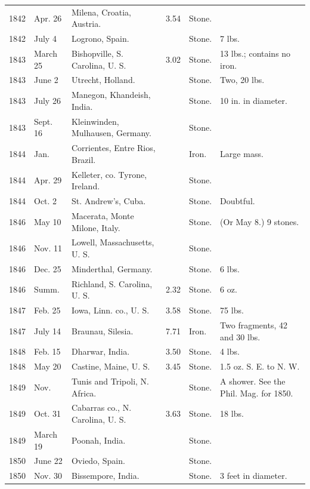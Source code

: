 \documentclass[a4paper, 12pt, oneside]{article}
\begin{document}
\begin{center}
\begin{longtable}{|p{10mm}|p{15mm}|p{32mm}|p{13mm}|p{13mm}|p{26mm}|}
        1842 & Apr. 26 & Milena, Croatia, Austria. & 3.54 & Stone. & ~ \\
        1842 & July 4 & Logrono, Spain. & ~ & Stone. & 7 lbs. \\
        1843 & March 25 & Bishopville, S. Carolina, U. S. & 3.02 & Stone. & 13 lbs.; contains no iron. \\
        1843 & June 2 & Utrecht, Holland. & ~ & Stone. & Two, 20 lbs. \\
        1843 & July 26 & Manegon, Khandeish, India. & ~ & Stone. & 10 in. in diameter. \\
        1843 & Sept. 16 & Kleinwinden, Mulhausen, Germany. & ~ & Stone. & ~ \\
        1844 & Jan. & Corrientes, Entre Rios, Brazil. & ~ & Iron. & Large mass. \\
        1844 & Apr. 29 & Kelleter, co. Tyrone, Ireland. & ~ & Stone. & ~ \\
        1844 & Oct. 2 & St. Andrew’s, Cuba. & ~ & Stone. & Doubtful. \\
        1846 & May 10 & Macerata, Monte Milone, Italy. & ~ & Stone. & (Or May 8.) 9 stones. \\
        1846 & Nov. 11 & Lowell, Massachusetts, U. S. & ~ & Stone. & ~ \\
        1846 & Dec. 25 & Minderthal, Germany. & ~ & Stone. & 6 lbs. \\
        1846 & Summ. & Richland, S. Carolina, U. S. & 2.32 & Stone. & 6 oz. \\
        1847 & Feb. 25 & Iowa, Linn. co., U. S. & 3.58 & Stone. & 75 lbs. \\
        1847 & July 14 & Braunau, Silesia. & 7.71 & Iron. & Two fragments, 42 and 30 lbs. \\
        1848 & Feb. 15 & Dharwar, India. & 3.50 & Stone. & 4 lbs. \\
        1848 & May 20 & Castine, Maine, U. S. & 3.45 & Stone. & 1.5 oz. S. E. to N. W. \\
        1849 & Nov. & Tunis and Tripoli, N. Africa. & ~ & Stone. & A shower. See the Phil. Mag. for 1850. \\
        1849 & Oct. 31 & Cabarras co., N. Carolina, U. S. & 3.63 & Stone. & 18 lbs. \\
        1849 & March 19 & Poonah, India. & ~ & Stone. & ~ \\
        1850 & June 22 & Oviedo, Spain. & ~ & Stone. & ~ \\
        1850 & Nov. 30 & Bissempore, India. & ~ & Stone. & 3 feet in diameter. \\

\end{longtable}
\end{center}
\end{document}
